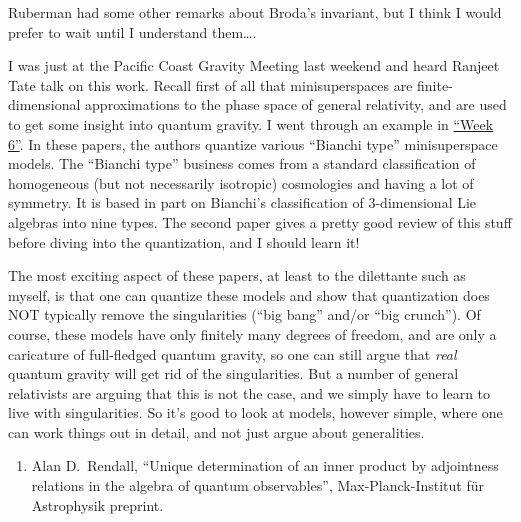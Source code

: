 \documentclass{article}
\def\tightlist{}
\renewcommand{\texttt}[1]{%
  \begingroup
  \ttfamily
  \begingroup\lccode`~=`/\lowercase{\endgroup\def~}{/\discretionary{}{}{}}%
  \begingroup\lccode`~=`[\lowercase{\endgroup\def~}{[\discretionary{}{}{}}%
  \begingroup\lccode`~=`.\lowercase{\endgroup\def~}{.\discretionary{}{}{}}%
  \catcode`/=\active\catcode`[=\active\catcode`.=\active
  \scantokens{#1\noexpand}%
  \endgroup
}
\begin{document}
Ruberman had some other remarks about Broda's invariant, but I think I
would prefer to wait until I understand them\ldots.


I was just at the Pacific Coast Gravity Meeting last weekend and heard
Ranjeet Tate talk on this work. Recall first of all that minisuperspaces
are finite-dimensional approximations to the phase space of general
relativity, and are used to get some insight into quantum gravity. I
went through an example in \protect\hyperlink{week6}{``Week 6''}. In
these papers, the authors quantize various ``Bianchi type''
minisuperspace models. The ``Bianchi type'' business comes from a
standard classification of homogeneous (but not necessarily isotropic)
cosmologies and having a lot of symmetry. It is based in part on
Bianchi's classification of 3-dimensional Lie algebras into nine types.
The second paper gives a pretty good review of this stuff before diving
into the quantization, and I should learn it!

The most exciting aspect of these papers, at least to the dilettante
such as myself, is that one can quantize these models and show that
quantization does NOT typically remove the singularities (``big bang''
and/or ``big crunch''). Of course, these models have only finitely many
degrees of freedom, and are only a caricature of full-fledged quantum
gravity, so one can still argue that \emph{real} quantum gravity will
get rid of the singularities. But a number of general relativists are
arguing that this is not the case, and we simply have to learn to live
with singularities. So it's good to look at models, however simple,
where one can work things out in detail, and not just argue about
generalities.

\begin{enumerate}
\def\labelenumi{\arabic{enumi})}
\setcounter{enumi}{6}
\tightlist
\item
  Alan D.\ Rendall, ``Unique determination of an inner product by adjointness relations in
  the algebra of quantum observables'',
  Max-Planck-Institut f\"ur Astrophysik preprint.
\end{enumerate}
\end{document}
